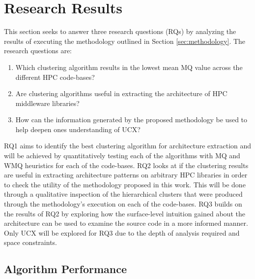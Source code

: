 \section{Research Results}
\label{sec:results}





This section seeks to answer three research questions (RQs) by analyzing the results of executing the methodology outlined in Section \ref{sec:methodology}. The research questions are:
\begin{enumerate}
    \item Which clustering algorithm results in the lowest mean MQ value across the different HPC code-bases?
    \item Are clustering algorithms useful in extracting the architecture of HPC middleware libraries?
    \item How can the information generated by the proposed methodology be used to help deepen ones understanding of UCX?
\end{enumerate}

RQ1 aims to identify the best clustering algorithm for architecture extraction and will be achieved by quantitatively testing each of the algorithms with MQ and WMQ heuristics for each of the code-bases. RQ2 looks at if the clustering results are useful in extracting architecture patterns on arbitrary HPC libraries in order to check the utility of the methodology proposed in this work. This will be done through a qualitative inspection of the hierarchical clusters that were produced through the methodology's execution on each of the code-bases. RQ3 builds on the results of RQ2 by exploring how the surface-level intuition gained about the architecture can be used to examine the source code in a more informed manner. Only UCX will be explored for RQ3 due to the depth of analysis required and space constraints.

\subsection{Algorithm Performance}
\label{subsec:alg_perf}

